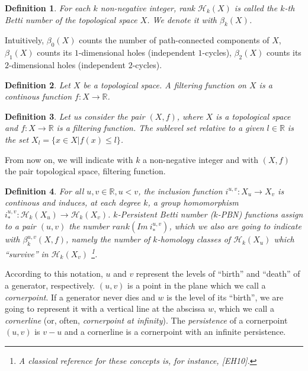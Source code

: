 \documentclass[english, LaM, oneside, noexaminfo]{sapthesis}
\newtheorem{defin}{\bf Definition}[section]
\begin{document}
\begin{defin} For each $k$ non-negative integer, rank $\mathcal{H}_k(X)$ is called the $k$-th Betti number of the topological space $X$. We denote it with $\beta_k(X)$. \end{defin}

\noindent Intuitively, $\beta_{0}(X)$ counts the number of path-connected components of $X$, $\beta_{1}(X)$ counts its $1$-dimensional holes (independent $1$-cycles), $\beta_{2}(X)$ counts its $2$-dimensional holes (independent $2$-cycles).

\begin{defin} Let $X$ be a topological space. A \textit{filtering function} on $X$ is a continous function $f: X \rightarrow \mathbb{R} $.\end{defin}

\begin{defin} \label{sublevelset} Let us consider the pair $(X, f)$, where $X$ is a topological space and $f: X \rightarrow \mathbb{R} $  is a filtering function. The \textit{sublevel set} relative to a given $l \in \mathbb{R}$ is the set $X_l = \{ x \in X | f(x) \leq l\}$. \end{defin}

From now on, we will indicate with $k$ a non-negative integer and with $(X,f)$ the pair topological space, filtering function. 

\begin{defin} \label{group homomorphism} For all $u,v \in \mathbb{R}, u < v$, the inclusion function $ i^{u,v}: X_u \rightarrow X_v$ is continous and induces, at each degree $k$, a group homomorphism $i_*^{u,v}: \mathcal{H}_k(X_u) \rightarrow \mathcal{H}_k(X_v)$. \textit{$k$-Persistent Betti number ($k$-PBN)  functions} assign to a pair $(u,v)$ the number $rank (Im \ i_*^{u,v})$, which we also are going to indicate with $\beta_{k}^{u,v}(X,f)$, namely the number of $k$-homology classes of $\mathcal{H}_k(X_u)$ which ``survive'' in $\mathcal{H}_k(X_v) $ \footnote{A classical reference for these concepts is, for instance, [EH10].}.\end{defin}

According to this notation, $u$ and $v$ represent the levels of ``birth'' and ``death'' of a generator, respectively. $(u,v)$ is a point in the plane which we call a \textit{cornerpoint}. If a generator never dies and $w$ is the level of its ``birth'', we are going to represent it with a vertical line at the abscissa $w$, which we call a \textit{cornerline} (or, often, \textit{cornerpoint at infinity}). The \textit{persistence} of a cornerpoint $(u,v)$ is $v-u$ and a cornerline is a cornerpoint with an infinite persistence.
\end{document}
